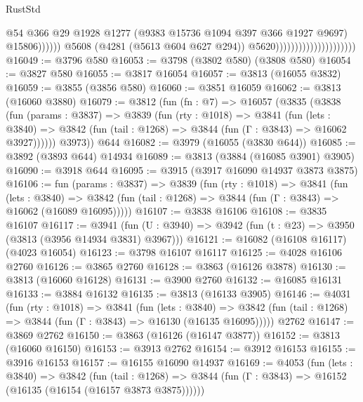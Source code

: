 \begin{lexlean}{RustStd}
\begin{coremodule}
{\begin{coremodule}
{{{{{{{{{{{{{{{{{{{{{{{{{{{{{{{{{{{                                                          @54
                                                          @366
                                                          @29
                                                          @1928
                                                          @1277
                                                          (@9383 @15736 @1094 @397 @366 @1927 @9697)
                                                          @15806))))))
                                              @5608
                                              (@4281 (@5613 @604 @627 @294))
                                              @5620)))))))))))))))))))))
@16049 := @3796 @580
@16053 := @3798 (@3802 @580) (@3808 @580)
@16054 := @3827 @580
@16055 := @3817 @16054
@16057 := @3813 (@16055 @3832)
@16059 := @3855 (@3856 @580)
@16060 := @3851 @16059
@16062 := @3813 (@16060 @3880)
@16079 := @3812
    (fun (fn : @7) =>
    @16057
      (@3835
        (@3838
          (fun (params : @3837) =>
          @3839
            (fun (rty : @1018) =>
            @3841
              (fun (lets : @3840) =>
              @3842 (fun (tail : @1268) => @3844 (fun (Γ : @3843) => @16062 @3927))))))
        @3973))
    @644
@16082 := @3979 (@16055 (@3830 @644))
@16085 := @3892 (@3893 @644) @14934
@16089 := @3813 (@3884 (@16085 @3901) @3905)
@16090 := @3918 @644
@16095 := @3915 (@3917 @16090 @14937 @3873 @3875)
@16106 := fun (params : @3837) =>
  @3839
    (fun (rty : @1018) =>
    @3841
      (fun (lets : @3840) =>
      @3842 (fun (tail : @1268) => @3844 (fun (Γ : @3843) => @16062 (@16089 @16095)))))
@16107 := @3838 @16106
@16108 := @3835 @16107
@16117 := @3941
    (fun (U : @3940) => @3942 (fun (t : @23) => @3950 (@3813 (@3956 @14934 @3831) @3967)))
@16121 := @16082 (@16108 @16117) (@4023 @16054)
@16123 := @3798 @16107 @16117
@16125 := @4028 @16106 @2760
@16126 := @3865 @2760
@16128 := @3863 (@16126 @3878)
@16130 := @3813 (@16060 @16128)
@16131 := @3900 @2760
@16132 := @16085 @16131
@16133 := @3884 @16132
@16135 := @3813 (@16133 @3905)
@16146 := @4031
    (fun (rty : @1018) =>
    @3841
      (fun (lets : @3840) =>
      @3842 (fun (tail : @1268) => @3844 (fun (Γ : @3843) => @16130 (@16135 @16095)))))
    @2762
@16147 := @3869 @2762
@16150 := @3863 (@16126 (@16147 @3877))
@16152 := @3813 (@16060 @16150)
@16153 := @3913 @2762
@16154 := @3912 @16153
@16155 := @3916 @16153
@16157 := @16155 @16090 @14937
@16169 := @4053
    (fun (lets : @3840) =>
    @3842
      (fun (tail : @1268) =>
      @3844 (fun (Γ : @3843) => @16152 (@16135 (@16154 (@16157 @3873 @3875))))))
}}}}}}}}}}}}}}}}}}}}}}}}}}}}}}}}}}}
\end{coremodule}}
\end{coremodule}
\end{lexlean}
